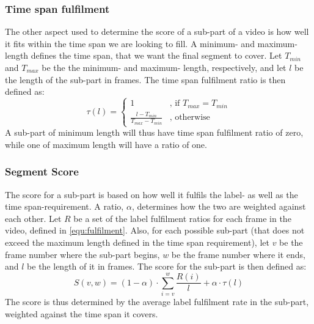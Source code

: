 \subsubsection{Time span fulfilment}
%
The other aspect used to determine the score of a sub-part of a video is how well it fits within the time span we are looking to fill. A minimum- and maximum- length defines the time span, that we want the final segment to cover. Let $T_{min}$ and $T_{max}$ be the the minimum- and maximum- length, respectively, and let $l$ be the length of the sub-part in frames. The time span fulfilment ratio is then defined as:\\
%
\begin{equation}
\tau(l) =
\begin{cases}
1 & \text{, if } T_{max} = T_{min}\\
\frac{l-T_{min}}{T_{max}-T_{min}} &  \text{, otherwise}
\end{cases}
\end{equation}\label{equ:fulfilment}
%
A sub-part of minimum length will thus have time span fulfilment ratio of zero, while one of maximum length will have a ratio of one. 
%
\subsubsection{Segment Score}
%
The score for a sub-part is based on how well it fulfils the label- as well as the time span-requirement. A ratio, $\alpha$, determines how the two are weighted against each other. Let $R$ be a set of the label fulfilment ratios for each frame in the video, defined in \ref{equ:fulfilment}. Also, for each possible sub-part (that does not exceed the maximum length defined in the time span requirement), let $v$ be the frame number where the sub-part begins, $w$ be the frame number where it ends, and $l$ be the length of it in frames. The score for the sub-part is then defined as:\\
%
\begin{equation}
S(v,w) =(1-\alpha) \cdot \sum_{i=v}^{w} \frac{R(i)}{l} + \alpha \cdot \tau(l)
\end{equation}\label{equ:segment_score}
%
%
%
The score is thus determined by the average label fulfilment rate in the sub-part, weighted against the time span it covers.
%
%
